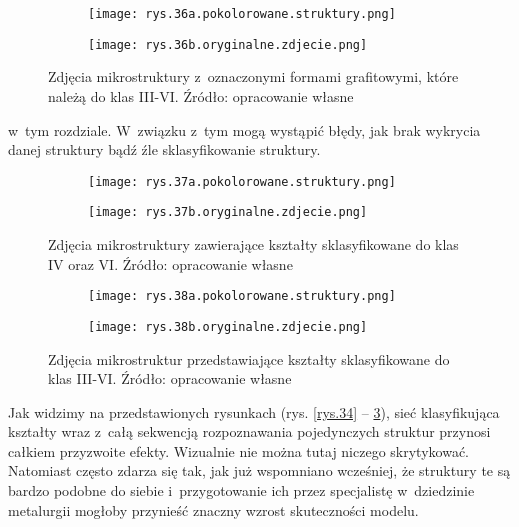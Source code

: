 \begin{figure}[h]
	\centering
	\begin{subfigure}{0.41\textwidth}
	    \centering
	    \texttt{[image: rys.36a.pokolorowane.struktury.png]}
	\end{subfigure}
	\begin{subfigure}{0.41\textwidth}
	    \centering
	    \texttt{[image: rys.36b.oryginalne.zdjecie.png]}
	\end{subfigure}
	\caption{\label{rys.36}Zdjęcia mikrostruktury z~oznaczonymi formami grafitowymi, które należą do klas III-VI. Źródło: opracowanie własne}
\end{figure}
w~tym rozdziale. W~związku z~tym mogą wystąpić błędy, jak brak wykrycia danej struktury bądź źle sklasyfikowanie struktury.
\begin{figure}[h]
	\centering
	\begin{subfigure}{0.41\textwidth}
	    \centering
	    \texttt{[image: rys.37a.pokolorowane.struktury.png]}
	\end{subfigure}
	\begin{subfigure}{0.41\textwidth}
	    \centering
	    \texttt{[image: rys.37b.oryginalne.zdjecie.png]}
	\end{subfigure}
	\caption{\label{rys.37}Zdjęcia mikrostruktury zawierające kształty sklasyfikowane do klas IV oraz VI. Źródło: opracowanie własne}
\end{figure}
\begin{figure}[!h]
	\centering
	\begin{subfigure}{0.41\textwidth}
	    \centering
	    \texttt{[image: rys.38a.pokolorowane.struktury.png]}
	\end{subfigure}
	\begin{subfigure}{0.41\textwidth}
	    \centering
	    \texttt{[image: rys.38b.oryginalne.zdjecie.png]}
	\end{subfigure}
	\caption{\label{rys.38}Zdjęcia mikrostruktur przedstawiające kształty sklasyfikowane do klas III-VI. Źródło: opracowanie własne}
\end{figure}
Jak widzimy na przedstawionych rysunkach (rys. \ref{rys.34} – \ref{rys.38}), sieć klasyfikująca kształty wraz z~całą sekwencją rozpoznawania pojedynczych struktur przynosi całkiem przyzwoite efekty. Wizualnie nie można tutaj niczego skrytykować. Natomiast często zdarza się tak, jak już wspomniano wcześniej, że struktury te są bardzo podobne do siebie i~przygotowanie ich przez specjalistę w~dziedzinie metalurgii mogłoby przynieść znaczny wzrost skuteczności modelu.

